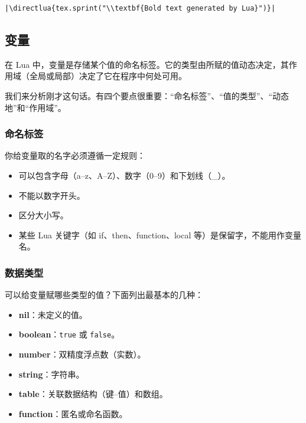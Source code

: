 \begin{mybox}
\begin{verbatim}
|\directlua{tex.sprint("\\textbf{Bold text generated by Lua}")}|
\end{verbatim}
\end{mybox}


\subsection{变量}

\begin{mybox}
  在 Lua 中，变量是存储某个值的命名标签。它的类型由所赋的值动态决定，其作用域（全局或局部）决定了它在程序中何处可用。
\end{mybox}

我们来分析刚才这句话。有四个要点很重要：“命名标签”、“值的类型”、“动态地”和“作用域”。


\subsubsection{命名标签}

你给变量取的名字必须遵循一定规则：

\begin{itemize}
  \item 可以包含字母（a–z、A–Z）、数字（0–9）和下划线（\_）。
  \item 不能以数字开头。
  \item 区分大小写。
  \item 某些 Lua 关键字（如 if、then、function、local 等）是保留字，不能用作变量名。
\end{itemize}

\subsubsection{数据类型}
\label{ssub:types}
 可以给变量赋哪些类型的值？下面列出最基本的几种：

\begin{itemize}
    \item \textbf{nil}：未定义的值。
    \item \textbf{boolean}：\texttt{true} 或 \texttt{false}。
    \item \textbf{number}：双精度浮点数（实数）。
    \item \textbf{string}：字符串。
    \item \textbf{table}：关联数据结构（键–值）和数组。
    \item \textbf{function}：匿名或命名函数。
\end{itemize}

